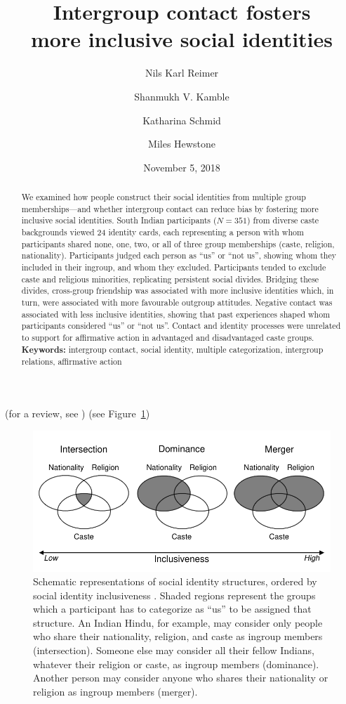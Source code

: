 \documentclass[12pt, a4paper]{article}
\title{Intergroup contact fosters\\more inclusive social identities}
\date{November 5, 2018}
\author{Nils Karl Reimer}
\author[2]{Shanmukh V. Kamble}
\author[3]{Katharina Schmid}
\author[1]{Miles Hewstone}
\affil[1]{University of Oxford}
\affil[2]{Karnatak University, Dharwad}
\affil[3]{ESADE Business School, Ramon Llull University}
\begin{document}
\maketitle

\begin{abstract}
\noindent We examined how people construct their social identities from multiple group memberships---and whether intergroup contact can reduce bias by fostering more inclusive social identities. South Indian participants ($N = 351$) from diverse caste backgrounds viewed 24 identity cards, each representing a person with whom participants shared none, one, two, or all of three group memberships (caste, religion, nationality). Participants judged each person as ``us'' or ``not us'', showing whom they included in their ingroup, and whom they excluded.  Participants tended to exclude caste and religious minorities, replicating persistent social divides. Bridging these divides, cross-group friendship was associated with more inclusive identities which, in turn, were associated with more favourable outgroup attitudes. Negative contact was associated with less inclusive identities, showing that past experiences shaped whom participants considered ``us'' or ``not us''. Contact and identity processes were unrelated to support for affirmative action in advantaged and disadvantaged caste groups.\\[1ex]
\noindent \textbf{Keywords:} intergroup contact, social identity, multiple categorization, intergroup relations, affirmative action \\[1ex]
\end{abstract}

\linenumbers

\noindent (for a review, see ) (see Figure~\ref{fig:f1}) \cite{devos_american_2005}

\begin{figure}
\centering
\includegraphics[scale=1]{../figures/figure-1}
\caption{
Schematic representations of social identity structures, ordered by social identity inclusiveness \protect{}. Shaded regions represent the groups which a participant has to categorize as ``us'' to be assigned that structure. An Indian Hindu, for example, may consider only people who share their nationality, religion, and caste as ingroup members (intersection). Someone else may consider all their fellow Indians, whatever their religion or caste, as ingroup members (dominance). Another person may consider anyone who shares their nationality or religion as ingroup members (merger).
}
\label{fig:f1}
\end{figure}

\nolinenumbers



\end{document}

